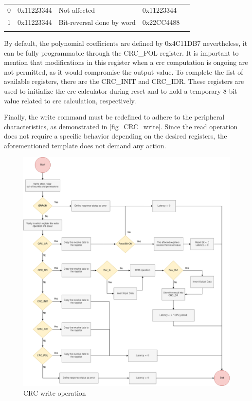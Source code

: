 \begin{table}[!htb]
\begin{minipage}{.5\linewidth}
{\begin{tabular}{lllll}
		\multicolumn{1}{|l|}{0} & \multicolumn{1}{l|}{0x11223344} & \multicolumn{1}{l|}{Not affected} & \multicolumn{1}{l|}{0x11223344} &  \\ \cline{1-4}
		\multicolumn{1}{|l|}{1} & \multicolumn{1}{l|}{0x11223344} & \multicolumn{1}{l|}{Bit-reversal done by word} & \multicolumn{1}{l|}{0x22CC4488} &  \\ \cline{1-4}
		 &  &  &  & 
		\end{tabular}%
        }   
        \label{tab:CRC_REV_OUT}
    \end{minipage}
	\label{tab:CRC_REV} 
\end{table}

By default, the polynomial coefficients are defined by 0x4C11DB7 nevertheless, it can be fully programmable through the CRC\_POL register.
It is important to mention that modifications in this register when a \gls{crc} computation is ongoing are not permitted, as it would 
compromise the output value. To complete the list of available registers, there are the CRC\_INIT and CRC\_IDR.  
These registers are used to initialize the \gls{crc} calculator during reset and to hold a temporary 8-bit value related to \gls{crc} 
calculation, respectively.

Finally, the write command must be redefined to adhere to the peripheral characteristics, as demonstrated in \autoref{fig_CRC_write}.
Since the read operation does not require a specific behavior depending on the desired registers, the aforementioned template does not demand any
action.   

\begin{figure}[ht!]
	\centering
 	\includegraphics[width=0.7\linewidth]{Images/CRC_write.png}
 	\caption{CRC write operation}
	 \label{fig_CRC_write}
\end{figure}

